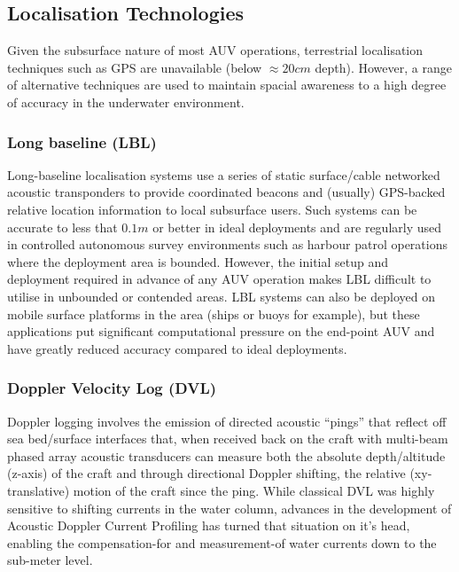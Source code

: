 \documentclass[conference]{IEEEtran}
\begin{document}
\subsection{Localisation Technologies}

Given the subsurface nature of most AUV operations, terrestrial localisation techniques such as GPS are unavailable (below $\approx 20cm$ depth). 
However, a range of alternative techniques are used to maintain spacial awareness to a high degree of accuracy in the underwater environment.
\subsubsection{Long baseline (LBL)}
Long-baseline localisation systems use a series of static surface/cable networked acoustic transponders to provide coordinated beacons and (usually) GPS-backed relative location information to local subsurface users. 
Such systems can be accurate to less that $0.1m$ or better in ideal deployments and are regularly used in controlled autonomous survey environments such as harbour patrol operations where the deployment area is bounded. 
However, the initial setup and deployment required in advance of any AUV operation makes LBL difficult to utilise in unbounded or contended areas.
LBL systems can also be deployed on mobile surface platforms in the area (ships or buoys for example), but these applications put significant computational pressure on the end-point AUV and have greatly reduced accuracy compared to ideal deployments\cite{Matos1999}.
\subsubsection{Doppler Velocity Log (DVL)}
Doppler logging involves the emission of directed acoustic ``pings'' that reflect off sea bed/surface interfaces that, when received back on the craft with multi-beam phased array acoustic transducers can measure both the absolute depth/altitude (z-axis) of the craft and through directional Doppler shifting, the relative (xy-translative) motion of the craft since the ping.
While classical DVL was highly sensitive to shifting currents in the water column, advances in the development of Acoustic Doppler Current Profiling has turned that situation on it's head, enabling the compensation-for and measurement-of water currents down to the sub-meter level\cite{Snyder2010}.
\end{document}
